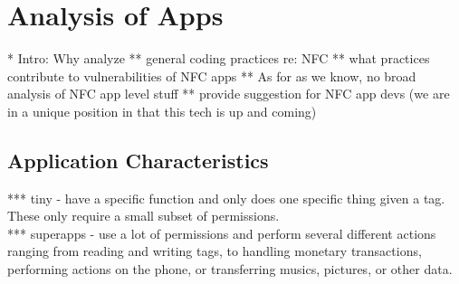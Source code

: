 \documentclass[12pt]{article}
\begin{document}
%
%
%
%

\section{Analysis of Apps}
* Intro: Why analyze
** general coding practices re: NFC
** what practices contribute to vulnerabilities of NFC apps
** As for as we know, no broad analysis of NFC app level stuff
** provide suggestion for NFC app devs (we are in a unique position in that this tech is up and coming)

\subsection{Application Characteristics}
*** tiny - have a specific function and only does one specific thing given a tag. These only require a small subset of permissions. 
\\
*** superapps - use a lot of permissions and perform several different actions ranging from reading and writing tags, to handling monetary transactions, performing actions on the phone, or transferring musics, pictures, or other data.
\end{document}
